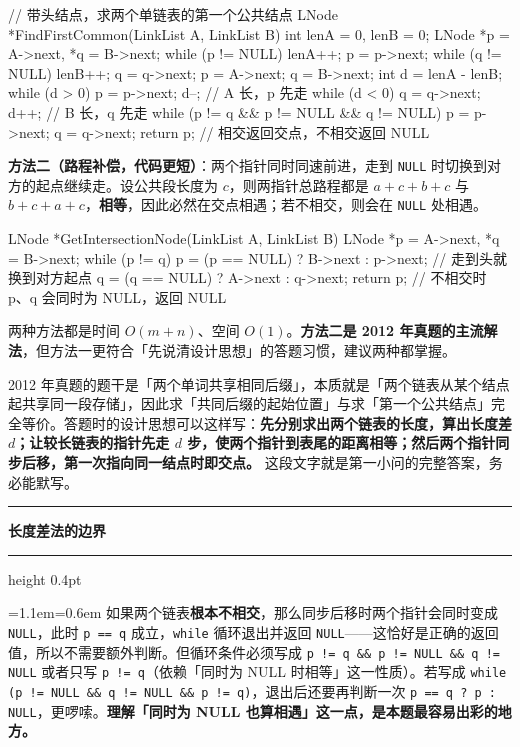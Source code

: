 \documentclass[11pt,openany,UTF8]{ctexbook}
\newcommand{\callouthead}[2]{%
  \par\addvspace{7pt}\noindent
  {\color{#1}\rule[-0.15em]{3pt}{1.05em}}\hspace{0.5em}%
  {\bfseries\color{#1}#2}\par\nobreak\vspace{-0.35em}%
  {\color{rulesep}\hrule height 0.4pt}\nobreak\vspace{0.45em}%
  \begingroup\small\setlength{\parindent}{0pt}%
  \leftskip=1.1em\rightskip=0.6em\noindent\ignorespaces}
\newcommand{\calloutend}{\par\endgroup\addvspace{7pt}}
\newenvironment{callwarn}[1]{\callouthead{warnbar}{#1}}{\calloutend}
\begin{document}
\begin{codebox}
// 带头结点，求两个单链表的第一个公共结点
LNode *FindFirstCommon(LinkList A, LinkList B) {
    int lenA = 0, lenB = 0;
    LNode *p = A->next, *q = B->next;
    while (p != NULL) { lenA++; p = p->next; }
    while (q != NULL) { lenB++; q = q->next; }
    p = A->next; q = B->next;
    int d = lenA - lenB;
    while (d > 0) { p = p->next; d--; }     // A 长，p 先走
    while (d < 0) { q = q->next; d++; }     // B 长，q 先走
    while (p != q && p != NULL && q != NULL) { p = p->next; q = q->next; }
    return p;                               // 相交返回交点，不相交返回 NULL
}
\end{codebox}

\textbf{方法二（路程补偿，代码更短）}：两个指针同时同速前进，走到 \texttt{NULL} 时切换到对方的起点继续走。设公共段长度为 $c$，则两指针总路程都是 $a+c+b+c$ 与 $b+c+a+c$，\textbf{相等}，因此必然在交点相遇；若不相交，则会在 \texttt{NULL} 处相遇。

\begin{codebox}
LNode *GetIntersectionNode(LinkList A, LinkList B) {
    LNode *p = A->next, *q = B->next;
    while (p != q) {
        p = (p == NULL) ? B->next : p->next;   // 走到头就换到对方起点
        q = (q == NULL) ? A->next : q->next;
    }
    return p;   // 不相交时 p、q 会同时为 NULL，返回 NULL
}
\end{codebox}

两种方法都是时间 $O(m+n)$、空间 $O(1)$。\textbf{方法二是 2012 年真题的主流解法}，但方法一更符合「先说清设计思想」的答题习惯，建议两种都掌握。

2012 年真题的题干是「两个单词共享相同后缀」，本质就是「两个链表从某个结点起共享同一段存储」，因此求「共同后缀的起始位置」与求「第一个公共结点」完全等价。答题时的设计思想可以这样写：\textbf{先分别求出两个链表的长度，算出长度差 $d$；让较长链表的指针先走 $d$ 步，使两个指针到表尾的距离相等；然后两个指针同步后移，第一次指向同一结点时即交点。} 这段文字就是第一小问的完整答案，务必能默写。

\begin{callwarn}{长度差法的边界}
如果两个链表\textbf{根本不相交}，那么同步后移时两个指针会同时变成 \texttt{NULL}，此时 \texttt{p =\allowbreak{}=\allowbreak{} q} 成立，\texttt{while} 循环退出并返回 \texttt{NULL}——这恰好是正确的返回值，所以不需要额外判断。但循环条件必须写成 \texttt{p !=\allowbreak{} q \&\& p !=\allowbreak{} NULL \&\& q !=\allowbreak{} NULL} 或者只写 \texttt{p !=\allowbreak{} q}（依赖「同时为 NULL 时相等」这一性质）。若写成 \texttt{while (p !=\allowbreak{} NULL \&\& q !=\allowbreak{} NULL \&\& p !=\allowbreak{} q)\allowbreak{}}，退出后还要再判断一次 \texttt{p =\allowbreak{}=\allowbreak{} q ? p :\allowbreak{} NULL}，更啰嗦。\textbf{理解「同时为 NULL 也算相遇」这一点，是本题最容易出彩的地方。}

\end{callwarn}
\end{document}
